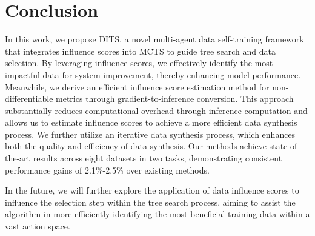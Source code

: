\section{Conclusion}
\label{section:conclusion}

In this work, we propose DITS, a novel multi-agent data self-training framework that integrates influence scores into MCTS to guide tree search and data selection. By leveraging influence scores, we effectively identify the most impactful data for system improvement, thereby enhancing model performance. Meanwhile, we derive an efficient influence score estimation method for non-differentiable metrics through gradient-to-inference conversion. This approach substantially reduces computational overhead through inference computation and allows us to estimate influence scores to achieve a more efficient data synthesis process. We further utilize an iterative data synthesis process, which enhances both the quality and efficiency of data synthesis. Our methods achieve state-of-the-art results across eight datasets in two tasks, demonstrating consistent performance gains of 2.1\%-2.5\% over existing methods.

In the future, we will further explore the application of data influence scores to influence the selection step within the tree search process, aiming to assist the algorithm in more efficiently identifying the most beneficial training data within a vast action space.